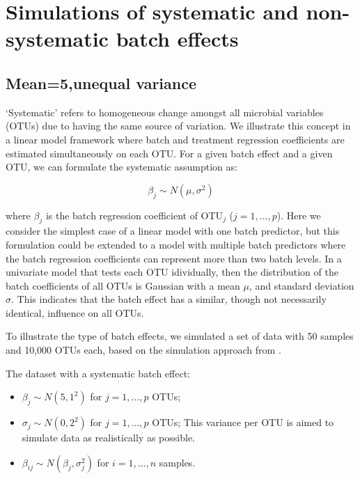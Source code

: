 \documentclass[]{book}
\providecommand{\tightlist}{%
  \setlength{\itemsep}{0pt}\setlength{\parskip}{0pt}}
\begin{document}
\chapter{Simulations of systematic and non-systematic batch
effects}\label{simu}

\section{Mean=5,unequal variance}\label{mean5unequal-variance}

`Systematic' refers to homogeneous change amongst all microbial
variables (OTUs) due to having the same source of variation. We
illustrate this concept in a linear model framework where batch and
treatment regression coefficients are estimated simultaneously on each
OTU. For a given batch effect and a given OTU, we can formulate the
systematic assumption as:

\[\beta_{j} \sim N(\mu,\sigma^{2})\]

where \(\beta_{j}\) is the batch regression coefficient of OTU\(_{j}\)
(\(j = 1,...,p\)). Here we consider the simplest case of a linear model
with one batch predictor, but this formulation could be extended to a
model with multiple batch predictors where the batch regression
coefficients can represent more than two batch levels. In a univariate
model that tests each OTU idividually, then the distribution of the
batch coefficients of all OTUs is Gaussian with a mean \(\mu\), and
standard deviation \(\sigma\). This indicates that the batch effect has
a similar, though not necessarily identical, influence on all OTUs.

To illustrate the type of batch effects, we simulated a set of data with
50 samples and 10,000 OTUs each, based on the simulation approach from
\cite{gagnon2013removing}.

The dataset with a systematic batch effect:

\begin{itemize}
\tightlist
\item
  \(\beta_{j} \sim N(5,1^{2})\) for \(j=1,...,p\) OTUs;\\
\item
  \(\sigma_{j} \sim N(0,2^{2})\) for \(j=1,...,p\) OTUs; This variance
  per OTU is aimed to simulate data as realistically as possible.\\
\item
  \(\beta_{ij} \sim N(\beta_{j}, \sigma_{j}^{2})\) for \(i = 1,...,n\)
  samples.
\end{itemize}
\end{document}
